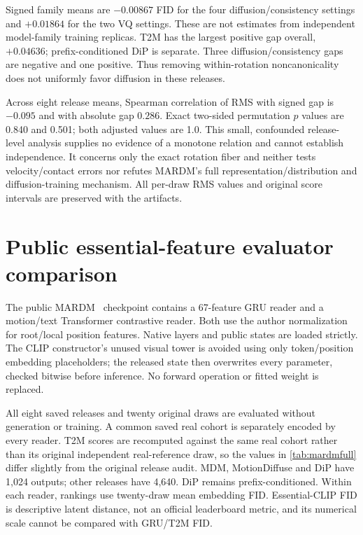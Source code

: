 Signed family means are $-0.00867$ FID for the four diffusion/consistency settings and $+0.01864$ for the two VQ settings. These are not estimates from independent model-family training replicas. T2M has the largest positive gap overall, $+0.04636$; prefix-conditioned DiP is separate. Three diffusion/consistency gaps are negative and one positive. Thus removing within-rotation noncanonicality does not uniformly favor diffusion in these releases.

Across eight release means, Spearman correlation of RMS with signed gap is $-0.095$ and with absolute gap $0.286$. Exact two-sided permutation $p$ values are 0.840 and 0.501; both adjusted values are 1.0. This small, confounded release-level analysis supplies no evidence of a monotone relation and cannot establish independence. It concerns only the exact rotation fiber and neither tests velocity/contact errors nor refutes MARDM's full representation/distribution and diffusion-training mechanism. All per-draw RMS values and original score intervals are preserved with the artifacts.

\section{Public essential-feature evaluator comparison}


The public MARDM~\cite{mardm2025} checkpoint contains a 67-feature GRU reader and a motion/text Transformer contrastive reader. Both use the author normalization for root/local position features. Native layers and public states are loaded strictly. The CLIP constructor's unused visual tower is avoided using only token/position embedding placeholders; the released state then overwrites every parameter, checked bitwise before inference. No forward operation or fitted weight is replaced.

All eight saved releases and twenty original draws are evaluated without generation or training. A common saved real cohort is separately encoded by every reader. T2M scores are recomputed against the same real cohort rather than its original independent real-reference draw, so the values in \cref{tab:mardmfull} differ slightly from the original release audit. MDM, MotionDiffuse and DiP have 1,024 outputs; other releases have 4,640. DiP remains prefix-conditioned. Within each reader, rankings use twenty-draw mean embedding FID. Essential-CLIP FID is descriptive latent distance, not an official leaderboard metric, and its numerical scale cannot be compared with GRU/T2M FID.

